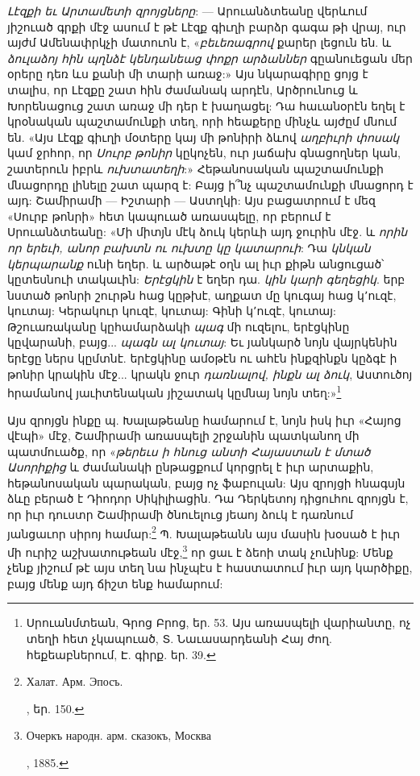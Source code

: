 \documentclass{article}
\begin{document}
{\emph{Լէզքի եւ Արտամետի զրոյցները}: — Արուանձտեանը վերևում յիշուած գրքի մէջ ասում է թէ Լէզք գիւղի բարձր գագա թի վրայ, ուր այժմ Ամենափրկչի մատուոն է, «\emph{բեւեռագրով} քարեր լեցուն են. և \emph{ձուլաձոյ հին պղնձէ կենդանեաց փոքր արձաններ} գըանուեցան մեր օրերը դեռ ևս քանի մի տարի առաջ:» Այս նկարագիրը ցոյց է տալիս, որ Լէզքը շատ հին ժամանակ արդէն, Արծրունուց և Խորենացուց շատ առաջ մի դեր է խաղացել: Դա հաւանօրէն եղել է կրօնական պաշտամունքի տեղ, որի հեաքերը մինչև այժըմ մնում են. «Այս Լէզք գիւղի մօտերը կայ մի թոնիրի ձևով \emph{աղբիւրի փոսակ} կամ ջրհոր, որ \emph{Սուրբ թոնիր} կըկոչեն, ուր յաճախ գնացողներ կան, շատերուն իբրև \emph{ուխտատեղի}:» Հեթանոսական պաշտամունքի մնացորդը լինելը շատ պարզ է: Բայց ի՞նչ պաշտամունքի մնացորդ է այդ: Շամիրամի — Իշտարի — Աստղկի: Այս բացատրում է մեզ «Սուրբ թոնրի» հետ կապուած առասպելը, որ բերում է Սրուանձտեանը: «Մի միտյն մէկ ձուկ կերևի այդ ջուրին մէջ. և \emph{որին որ երեւի, անոր բախտն ու ուխտը կը կատարուի}: Դա \emph{կնկան կերպարանք} ունի եղեր. և արծաթէ օղն ալ իւր քիթն անցուցած՝ կըտեսնուի տակաւին: \emph{Երէցկին} է եղեր դա. \emph{կին կարի գեղեցիկ}. երբ նստած թոնրի շուրթն հաց կըթխէ, աղքատ մը կուգայ հաց կ՚ուզէ, կուտայ: Կերակուր կուզէ, կուտայ: Գինի կ՚ուզէ, կուտայ: Թշուառականը կըհամարձակի \emph{պագ} մի ուզելու, երէցկինը կըվարանի, բայց... \emph{պագն ալ կուտայ}: Եւ յանկարծ նոյն վայրկենին երէցը ներս կըմտնէ. երէցկինը ամօթէն ու ահէն ինքզինքն կըձգէ ի թոնիր կրակին մէջ... կրակն ջուր \emph{դառնալով, ինքն ալ ձուկ}, Աստուծոյ հրամանով յաւիտենական յիշատակ կըմնայ նոյն տեղ:»\footnote{Սրուանմտեան, Գրոց Բրոց, եր. 53. Այս առասպելի վարիանտը, ոչ տեղի հետ չկապուած, Տ. Նաւասարդեանի Հայ ժող. հեքեաբներում, Է. գիրք. եր. 39.}

Այս զրոյցն ինքը պ. Խալաթեանը համարում է, նոյն իսկ իւր «Հայոց վէպի» մէջ, Շամիրամի առասպելի շրջանին պատկանող մի պատմուածք, որ «\emph{թերեւս ի հնուց անտի Հայաստան է մտած Ասորիքից} և ժամանակի ընթացքում կորցրել է իւր արտաքին, հեթանոսական պարական, բայց ոչ ֆաբուլան: Այս զրոյցի հնագսյն ձևը բերած է Դիոդոր Սիկիլիացին. Դա Դերկետոյ դիցուհու զրոյցն է, որ իւր դուստր Շամիրամի ծնուելուց յեաոյ ձուկ է դառնում յանցաւոր սիրոյ համար:\footnote{\begin{russian}Халат. Арм. Эпосъ.\end{russian}, եր. 150.} Պ. Խալաթեանն այս մասին խօսած է իւր մի ուրիշ աշխատութեան մէջ,\footnote{\begin{russian}Очеркъ народн. арм. сказокъ, Москва\end{russian}, 1885.} որ ցաւ է ձեոի տակ չունինք: Մենք չենք յիշում թէ այս տեղ նա ինչպէս է հաստատում իւր այդ կարծիքը, բայց մենք այդ ճիշտ ենք համարում:

}
\end{document}
